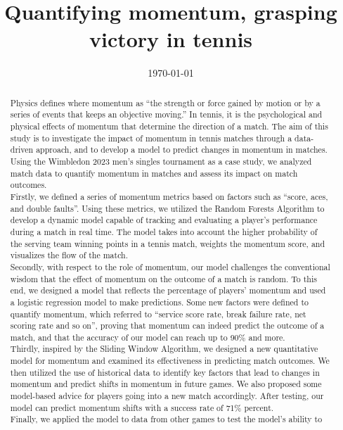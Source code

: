 \documentclass{mcmthesis}
\title{Quantifying momentum, grasping victory in tennis}
\date{\today}
\begin{document}
\begin{abstract}

    Physics defines where momentum as “the strength or force gained by motion or by a series of
    events that keeps an objective moving.” In tennis, it is the psychological and physical effects of
    momentum that determine the direction of a match. The aim of this study is to investigate the
    impact of momentum in tennis matches through a data-driven approach, and to develop a
    model to predict changes in momentum in matches. Using the Wimbledon 2023 men's singles
    tournament as a case study, we analyzed match data to quantify momentum in matches and assess
    its impact on match outcomes.\\
     Firstly, we defined a series of momentum metrics based on factors such as “score, aces, and
    double faults”. Using these metrics, we utilized the Random Forests Algorithm to develop a
    dynamic model capable of tracking and evaluating a player's performance during a match in real
    time. The model takes into account the higher probability of the serving team winning points in a
    tennis match, weights the momentum score, and visualizes the flow of the match.\\
    Secondly, with respect to the role of momentum, our model challenges the conventional
    wisdom that the effect of momentum on the outcome of a match is random. To this end, we
    designed a model that reflects the percentage of players' momentum and used a logistic regression
    model to make predictions. Some new factors were defined to quantify momentum, which
    referred to “service score rate, break failure rate, net scoring rate and so on”, proving that
    momentum can indeed predict the outcome of a match, and that the accuracy of our model can
    reach up to 90\% and more. \\
     Thirdly, inspired by the Sliding Window Algorithm, we designed a new quantitative model
    for momentum and examined its effectiveness in predicting match outcomes. We then utilized the
    use of historical data to identify key factors that lead to changes in momentum and predict shifts in
    momentum in future games. We also proposed some model-based advice for players going into a
    new match accordingly. After testing, our model can predict momentum shifts with a success rate
    of 71\% percent.\\
     Finally, we applied the model to data from other games to test the model's ability to

\end{abstract}
\end{document}
